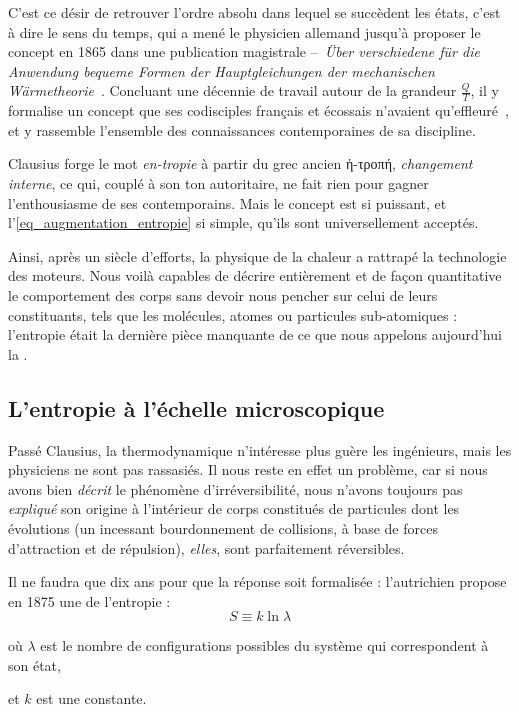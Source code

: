 		C’est ce désir de retrouver l’ordre absolu dans lequel se succèdent les états, c’est à dire le sens du temps, qui a mené le physicien allemand  jusqu’à proposer le concept  en 1865 dans une publication magistrale --\ \textit{Über verschiedene für die Anwendung bequeme Formen der Hauptgleichungen der mechanischen Wärmetheorie}~\cite{clausius1865,clausius1867en,clausius1868fr2}. Concluant une décennie de travail autour de la grandeur $\frac{Q}{T}$, il y formalise un concept que ses codisciples français  et écossais  n’avaient qu’effleuré~\cite{truesdell1980}, et y rassemble l’ensemble des connaissances contemporaines de sa discipline.
		
		Clausius forge le mot \textit{en-tropie} à partir du grec ancien \textgreek{ἡ-τροπή}, \textit{changement interne}, ce qui, couplé à son ton autoritaire, ne fait rien pour gagner l’enthousiasme de ses contemporains. Mais le concept est si puissant, et l’\cref{eq_augmentation_entropie} si simple, qu’ils sont universellement acceptés.
		
		Ainsi, après un siècle d’efforts, la physique de la chaleur a rattrapé la technologie des moteurs. Nous voilà capables de décrire entièrement et de façon quantitative le comportement des corps sans devoir nous pencher sur celui de leurs constituants, tels que les molécules, atomes ou particules sub-atomiques : l’entropie était la dernière pièce manquante de ce que nous appelons aujourd’hui la .
		
		
	\subsection{L’entropie à l’échelle microscopique}
	\label{ch_entropie_boltzmann}
	
		Passé Clausius, la thermodynamique n’intéresse plus guère les ingénieurs, mais les physiciens ne sont pas rassasiés. Il nous reste en effet un problème, car si nous avons bien \emph{décrit} le phénomène d’irréversibilité, nous n’avons toujours pas \emph{expliqué} son origine à l’intérieur de corps constitués de particules dont les évolutions (un incessant bourdonnement de collisions, à base de forces d’attraction et de répulsion), \emph{elles}, sont parfaitement réversibles.
		
		Il ne faudra que dix ans pour que la réponse soit formalisée : l’autrichien  propose en 1875 une  de l’entropie :
			\begin{equation}
				S \equiv k \ln \lambda
			\end{equation}
			\begin{equationterms}
				\item où \tab $\lambda$ \tab est le nombre de configurations possibles du système qui correspondent à son état, 
				\item et \tab $k$ \tab est une constante.
			\end{equationterms}
		
